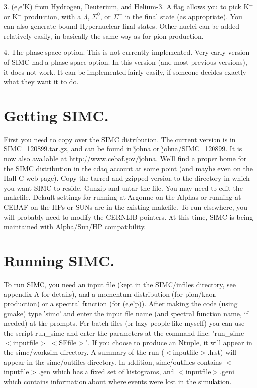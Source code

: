 \smallskip

3. (e,e'K) from Hydrogen, Deuterium, and Helium-3.  A flag allows you to pick
K$^+$ or K$^-$ production, with a $\Lambda$, $\Sigma^0$, or $\Sigma^-$
in the final state (as appropriate).  You can also generate bound Hypernuclear
final states. Other nuclei can be added relatively easily, in basically the
same way as for pion production.

\smallskip

4. The phase space option.  This is not currently implemented.  Very early
version of SIMC had a phase space option.  In this version (and most previous
versions), it does not work. It can be implemented fairly easily, if someone
decides exactly what they want it to do.



\section{Getting SIMC.}

First you need to copy over the SIMC distribution.  The current version is
in SIMC\_120899.tar.gz, and can be found in \~johna or \~johna/SIMC\_120899.
It is now also available at http://www.cebaf.gov/\~johna. We'll find a proper
home for the SIMC distribution in the cdaq account at some point (and maybe
even on the Hall C web page).  Copy the tarred and gzipped version to the
directory in which you want SIMC to reside.  Gunzip and untar the file.  You
may need to edit the makefile.  Default settings for running at Argonne on the
Alphas or running at CEBAF on the HPs or SUNs are in the existing makefile. To
run elsewhere, you will probably need to modify the CERNLIB pointers. At this
time, SIMC is being maintained with Alpha/Sun/HP compatibility.





\section{Running SIMC.}

To run SIMC, you need an input file (kept in the SIMC/infiles directory, see
appendix A for details), and a momentum distribution (for pion/kaon
production) or a spectral function (for (e,e'p)).  After making the code
(using gmake) type 'simc' and enter the input file name (and spectral function
name, if needed) at the prompts. For batch files (or lazy people like myself)
you can use the script run\_simc and enter the parameters at the command line:
"run\_simc $<$inputfile$>$ $<$SFfile$>$".  If you choose to produce an Ntuple,
it will appear in the simc/worksim directory.  A summary of the run
($<$inputfile$>$.hist) will appear in the simc/outfiles directory.  In
addition, simc/outfiles contains $<$inputfile$>$.gen which has a fixed set of
histograms, and $<$inputfile$>$.geni which contains information about where
events were lost in the simulation.



